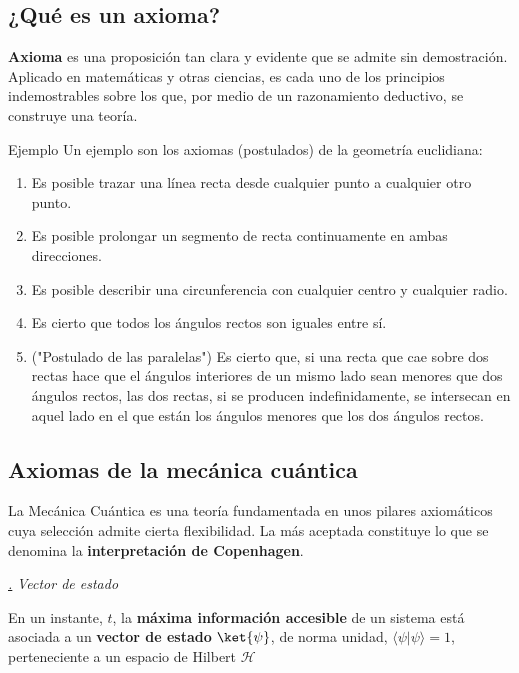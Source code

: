 \documentclass[a4paper,11pt]{book} %
\numberwithin{equation}{chapter}
\newcommand{\braket}[2]{\langle #1|#2\rangle}
\def\subsubiContadorIt{\par\addtocounter{subsubsection}{1}\underline{\it\thesubsubsection.}\hskip0.5cm \setcounter{subsubsubsectionIt}{0}}
\newcommand{\SubsubiIt}[1]{
		\subsubiContadorIt \textit{#1}
	}
\newcounter{subsubsubsectionIt}[subsubsection]
\begin{document}
		\subsection{¿Qué es un axioma?}

\begin{mybox_gray2}{}
\textbf{Axioma} es una proposición tan clara y evidente que se admite sin demostración. Aplicado en matemáticas y otras ciencias, es cada uno de los principios indemostrables sobre los que, por medio de un razonamiento deductivo, se construye una teoría.
\end{mybox_gray2}

\begin{mybox_green}{Ejemplo}
Un ejemplo son los axiomas (postulados) de la geometría euclidiana:
\begin{enumerate}
	\item Es posible trazar una línea recta desde cualquier punto a cualquier otro punto.
	\item Es posible prolongar un segmento de recta continuamente en ambas direcciones.
	\item Es posible describir una circunferencia con cualquier centro y cualquier radio.
	\item Es cierto que todos los ángulos rectos son iguales entre sí.
	\item ("Postulado de las paralelas") Es cierto que, si una recta que cae sobre dos rectas hace que el ángulos interiores de un mismo lado sean menores que dos ángulos rectos, las dos rectas, si se producen indefinidamente, se intersecan en aquel lado en el que están los ángulos menores que los dos ángulos rectos.
\end{enumerate}
\end{mybox_green}	
	

		\subsection{Axiomas de la mecánica cuántica}	

La Mecánica Cuántica es una teoría fundamentada en unos pilares axiomáticos cuya selección admite cierta flexibilidad. La más aceptada constituye lo que se denomina la \textbf{interpretación de Copenhagen}. 

		\SubsubiIt{Vector de estado}

\begin{mybox_gray2}{}
En un instante, $t$, la \textbf{máxima información accesible} de un sistema está asociada a un \textbf{vector de estado} $\ket{\psi}$, de norma unidad, $\braket{\psi}{\psi}=1$,  
perteneciente a un espacio de Hilbert $\mathcal{H}$
\end{mybox_gray2}
\end{document}

